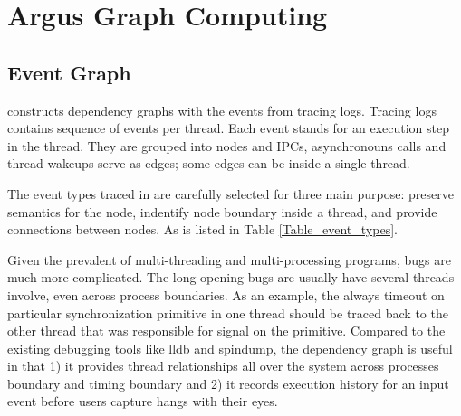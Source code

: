 \section{Argus Graph Computing}\label{sec:graphcomputing}

\subsection{Event Graph}\label{subsec:eventgraph}

\xxx constructs dependency graphs with the events from tracing logs. Tracing
logs contains sequence of events per thread. Each event stands for an execution
step in the thread. They are grouped into nodes and IPCs, asynchronouns calls
and thread wakeups serve as edges; some edges can be inside a single thread.

The event types traced in \xxx are carefully selected for three main
purpose: preserve semantics for the node, indentify node boundary inside
a thread, and provide connections between nodes. As is listed in Table
\ref{Table_event_types}.

Given the prevalent of multi-threading and multi-processing programs, bugs are
much more complicated. The long opening bugs are usually have several threads
involve, even across process boundaries. As an example, the always timeout on
particular synchronization primitive in one thread should be traced back to the
other thread that was responsible for signal on the primitive. Compared to the
existing debugging tools like lldb and spindump, the dependency graph is useful
in that 1) it provides thread relationships all over the system across processes
boundary and timing boundary and 2) it records execution history for an input
event before users capture hangs with their eyes.

